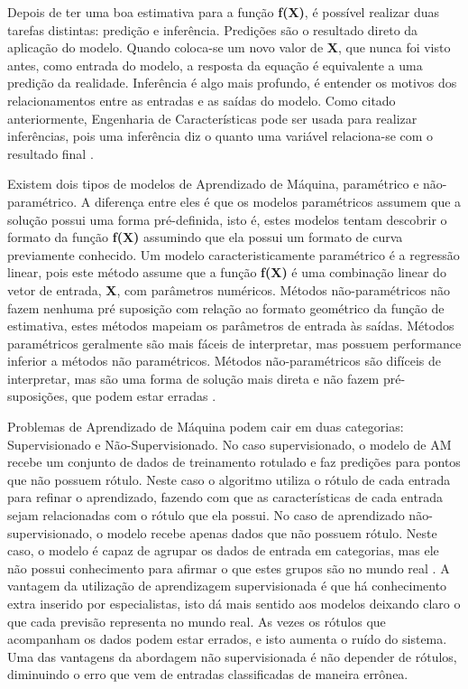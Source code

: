 Depois de ter uma boa estimativa para a função \textbf{f(X)}, é possível realizar duas tarefas distintas: predição e inferência. Predições são o resultado direto da aplicação do modelo. Quando coloca-se um novo valor de \textbf{X}, que nunca foi visto antes, como entrada do modelo, a resposta da equação é equivalente a uma predição da realidade. Inferência é algo mais profundo, é entender os motivos dos relacionamentos entre as entradas e as saídas do modelo. Como citado anteriormente, Engenharia de Características pode ser usada para realizar inferências, pois uma inferência diz o quanto uma variável relaciona-se com o resultado final \cite{real2013}. 

Existem dois tipos de modelos de Aprendizado de Máquina, paramétrico e não-paramétrico. A diferença entre eles é que os modelos paramétricos assumem que a solução possui uma forma pré-definida, isto é, estes modelos tentam descobrir o formato da função \textbf{f(X)} assumindo que ela possui um formato de curva previamente conhecido. Um modelo caracteristicamente paramétrico é a regressão linear, pois este método assume que a função \textbf{f(X)} é uma combinação linear do vetor de entrada, \textbf{X}, com parâmetros numéricos. Métodos não-paramétricos não fazem nenhuma pré suposição com relação ao formato geométrico da função de estimativa, estes métodos mapeiam os parâmetros de entrada às saídas. Métodos paramétricos geralmente são mais fáceis de interpretar, mas possuem performance inferior a métodos não paramétricos. Métodos não-paramétricos são difíceis de interpretar, mas são uma forma de solução mais direta e não fazem pré-suposições, que podem estar erradas \cite{on2014}.

Problemas de Aprendizado de Máquina podem cair em duas categorias: Supervisionado e Não-Supervisionado. No caso supervisionado, o modelo de AM recebe um conjunto de dados de treinamento rotulado e faz predições para pontos que não possuem rótulo. Neste caso o algoritmo utiliza o rótulo de cada entrada para refinar o aprendizado, fazendo com que as características de cada entrada sejam relacionadas com o rótulo que ela possui. No caso de aprendizado não-supervisionado, o modelo recebe apenas dados que não possuem rótulo. Neste caso, o modelo é capaz de agrupar os dados de entrada em categorias, mas ele não possui conhecimento para afirmar o que estes grupos são no mundo real \cite{foundations2012}. A vantagem da utilização de aprendizagem supervisionada é que há conhecimento extra inserido por especialistas, isto dá mais sentido aos modelos deixando claro o que cada previsão representa no mundo real. As vezes os rótulos que acompanham os dados podem estar errados, e isto aumenta o ruído do sistema. Uma das vantagens da abordagem não supervisionada é não depender de rótulos, diminuindo o erro que vem de entradas classificadas de maneira errônea. 

